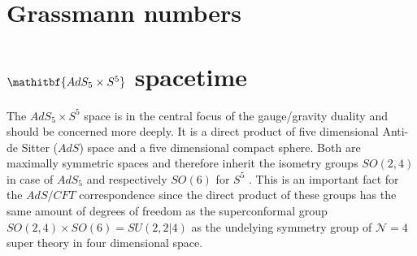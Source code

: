 %
%
%
%
%
\chapter{Grassmann numbers}

%
%
%
%
%
\chapter[$\mathbf{AdS_{5}\times S^{5}}$ spacetime]{$\mathitbf{AdS_{5}\times S^{5}}$ spacetime}%
The $AdS_{5}\times S^{5}$ space is in the central focus of the gauge/gravity duality and should be concerned more deeply. It is a direct product of five dimensional Anti-de Sitter ($AdS$) space and a five dimensional compact sphere. Both are maximally symmetric spaces and therefore inherit the isometry groups $SO(2,4)$ in case of $AdS_{5}$ and respectively $SO(6)$ for $S^{5}$ \cite{Ammon:2015wua}. This is an important fact for the $AdS/CFT$ correspondence since the direct product of these groups has the same amount of degrees of freedom as the superconformal group $SO(2,4)\times SO(6) = SU(2,2\vert 4)$ as the undelying symmetry group of $\mathcal{N}=4$ super  theory in four dimensional  space.
%
%
